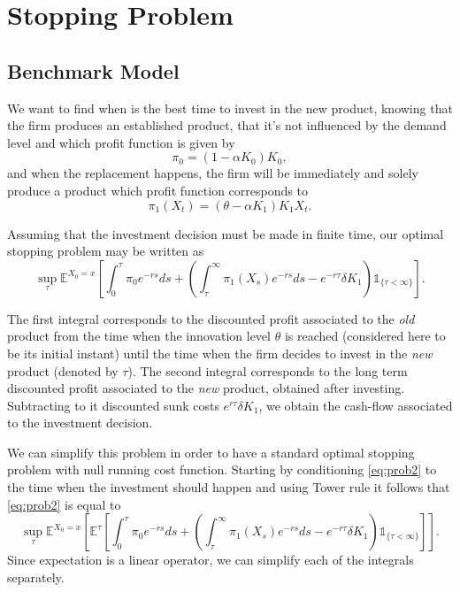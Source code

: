 \section{Stopping Problem}
\label{section:2_theory}



\subsection{Benchmark Model}
\label{subsec:2_bm}

We want to find when is the best time to invest in the new product, knowing that the firm produces an established product, that it's not influenced by the demand level and which profit function is given by 
\begin{equation}
\pi_0=(1-\alpha K_0)K_0,
\label{pi0}
\end{equation}
and when the replacement happens, the firm will be immediately and solely produce a product which profit function corresponds to
\begin{equation}
\pi_1(X_t) =(\theta-\alpha K_1)K_1 X_t.
\label{pi1}
\end{equation}

Assuming that the investment decision must be made in finite time, our optimal stopping problem may be written as
\begin{equation}
\sup _\tau \mathds{E}^{X_0=x} \left[  \int_0^\tau \pi_0e^{-rs} ds +  \left( \int_\tau^\infty \pi_1(X_s)e^{-rs}ds -e^{-r\tau}\delta K_1 \right) \mathds{1}_{\{ \tau < \infty \}} \right].
\label{eq:prob2}
\end{equation}

The first integral corresponds to the discounted profit associated to the \textit{old} product from the time when the innovation level $\theta$ is reached (considered here to be its initial instant) until the time when the firm decides to invest in the \textit{new} product (denoted by $\tau$). The second integral corresponds to the long term discounted profit associated to the \textit{new} product, obtained after investing. Subtracting to it discounted sunk costs $e^{r \tau} \delta K_1$, we obtain the cash-flow associated to the investment decision.

We can simplify this problem in order to have a standard optimal stopping problem with null running cost function.
Starting by conditioning \eqref{eq:prob2} to the time when the investment should happen and using Tower rule it follows that \eqref{eq:prob2} is equal to
\begin{equation}
\sup _\tau \mathds{E}^{X_0=x} \left[ \mathds{E}^{\tau} \left[  \int_0^\tau \pi_0e^{-rs} ds +  \left(  \int_\tau^\infty \pi_1(X_s)e^{-rs}ds -e^{-r\tau} \delta K_1   \right) \mathds{1}_{\{ \tau < \infty \}} \right] \right].
\label{eq:prob21}
\end{equation}
Since expectation is a linear operator, we can simplify each of the integrals separately.

